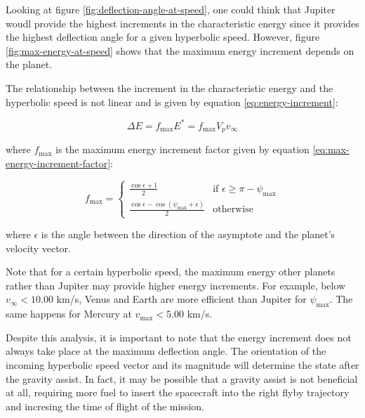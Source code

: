 Looking at figure \ref{fig:deflection-angle-at-speed}, one could think that
Jupiter woudl provide the highest increments in the characteristic energy since
it provides the highest deflection angle for a given hyperbolic speed. However,
figure \ref{fig:max-energy-at-speed} shows that the maximum energy increment
depends on the planet.

The relationship between the increment in the characteristic energy and the
hyperbolic speed is not linear and is given by equation
\ref{eq:energy-increment}:

\begin{equation}
  \Delta E = f_{\text{max}} E^{\ast} = f_{\text{max}} V_p v_{\infty}
  \label{eq:energy-increment}
\end{equation}

where $f_{\text{max}}$ is the maximum energy increment factor given by equation
\ref{eq:max-energy-increment-factor}:

\begin{equation}
  f_{\text{max}} = \begin{cases}
    \frac{\cos{\epsilon} + 1}{2}                                         & \text{if } \epsilon \geq \pi - \psi_{\max} \\
    \frac{\cos{\epsilon} - \cos{\left(\psi_{\max} + \epsilon\right)}}{2} & \text{otherwise}
  \end{cases}
  \label{eq:max-energy-increment-factor}
\end{equation}

where $\epsilon$ is the angle between the direction of the asymptote and the
planet's velocity vector.

Note that for a certain hyperbolic speed, the maximum energy other planets
rather than Jupiter may provide higher energy increments. For example, below
$v_{\infty} < 10.00$ km/s, Venus and Earth are more efficient than Jupiter for
$\psi_{\text{max}}$. The same happens for Mercury at $v_{\text{max}} < 5.00$
km/s.

Despite this analysis, it is important to note that the energy increment does
not always take place at the maximum deflection angle. The orientation of the
incoming hyperbolic speed vector and its magnitude will determine the state
after the gravity assist. In fact, it may be possible that a gravity assist is
not beneficial at all, requiring more fuel to insert the spacecraft into the
right flyby trajectory and incresing the time of flight of the mission.
